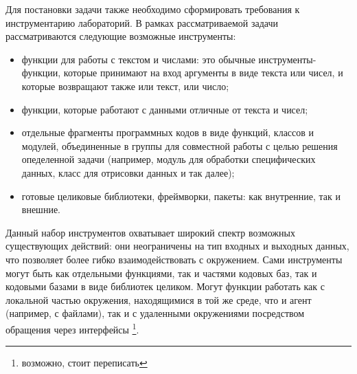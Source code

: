 Для постановки задачи также необходимо сформировать требования к инструментарию лабораторий.
В рамках рассматриваемой задачи рассматриваются следующие возможные инструменты:
\begin{itemize}
    \item функции для работы с текстом и числами: это обычные инструменты-функции, которые
принимают на вход аргументы в виде текста или чисел, и которые возвращают 
также или текст, или число;
    \item функции, которые работают с данными отличные от текста и чисел;
    \item отдельные фрагменты программных кодов в виде функций, классов и модулей, 
объединенные в группы для совместной работы с целью решения опеделенной задачи 
(например, модуль для обработки специфических данных, класс для отрисовки данных 
и так далее);
    \item готовые целиковые библиотеки, фреймворки, пакеты: как внутренние, так и внешние.
\end{itemize}
Данный набор инструментов охватывает широкий спектр возможных существующих действий: они
неограничены на тип входных и выходных данных, что позволяет более гибко взаимодействовать
с окружением. Сами инструменты могут быть как отдельными функциями, так и частями 
кодовых баз, так и кодовыми базами в виде библиотек целиком. Могут функции работать как
с локальной частью окружения, находящимися в той же среде, что и агент (например, с файлами),
так и с удаленными окружениями посредством обращения через интерфейсы \footnote{возможно, 
стоит переписать}.

